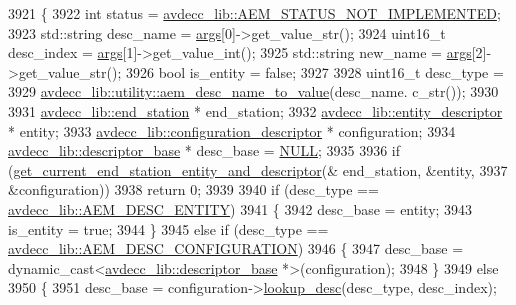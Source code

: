 \begin{DoxyCode}
3921 \{
3922     \textcolor{keywordtype}{int} status = \hyperlink{namespaceavdecc__lib_affd436edb2cecd20cfd784a84f852b2ba1de0a38d458af43bc8965b715fd37b4f}{avdecc\_lib::AEM\_STATUS\_NOT\_IMPLEMENTED};
3923     std::string desc\_name = \hyperlink{namespaceastime__fitline_a8187411843a6284ffb964ef3fb9fcab3}{args}[0]->get\_value\_str();
3924     uint16\_t desc\_index = \hyperlink{namespaceastime__fitline_a8187411843a6284ffb964ef3fb9fcab3}{args}[1]->get\_value\_int();
3925     std::string new\_name = \hyperlink{namespaceastime__fitline_a8187411843a6284ffb964ef3fb9fcab3}{args}[2]->get\_value\_str();
3926     \textcolor{keywordtype}{bool} is\_entity = \textcolor{keyword}{false};
3927 
3928     uint16\_t desc\_type =
3929         \hyperlink{namespaceavdecc__lib_1_1utility_a9f6076e32fa227555a95b6e95ea1e29b}{avdecc\_lib::utility::aem\_desc\_name\_to\_value}(desc\_name.
      c\_str());
3930 
3931     \hyperlink{classavdecc__lib_1_1end__station}{avdecc\_lib::end\_station} * end\_station;
3932     \hyperlink{classavdecc__lib_1_1entity__descriptor}{avdecc\_lib::entity\_descriptor} * entity;
3933     \hyperlink{classavdecc__lib_1_1configuration__descriptor}{avdecc\_lib::configuration\_descriptor} * configuration;
3934     \hyperlink{classavdecc__lib_1_1descriptor__base}{avdecc\_lib::descriptor\_base} * desc\_base = \hyperlink{openavb__types__base__pub_8h_a070d2ce7b6bb7e5c05602aa8c308d0c4}{NULL};
3935 
3936     \textcolor{keywordflow}{if} (\hyperlink{classcmd__line_ac2d4611fba7db03d436a2e3c1e64828e}{get\_current\_end\_station\_entity\_and\_descriptor}(&
      end\_station, &entity,
3937                                                       &configuration))
3938         \textcolor{keywordflow}{return} 0;
3939 
3940     \textcolor{keywordflow}{if} (desc\_type == \hyperlink{namespaceavdecc__lib_ac7b7d227e46bc72b63ee9e9aae15902fac9ebb31a55e5894637f6c3c710ceceaf}{avdecc\_lib::AEM\_DESC\_ENTITY})
3941     \{
3942         desc\_base = entity;
3943         is\_entity = \textcolor{keyword}{true};
3944     \}
3945     \textcolor{keywordflow}{else} \textcolor{keywordflow}{if} (desc\_type == \hyperlink{namespaceavdecc__lib_ac7b7d227e46bc72b63ee9e9aae15902fab391827cda146b0d4199adf80f47117a}{avdecc\_lib::AEM\_DESC\_CONFIGURATION})
3946     \{
3947         desc\_base = \textcolor{keyword}{dynamic\_cast<}\hyperlink{classavdecc__lib_1_1descriptor__base}{avdecc\_lib::descriptor\_base} *\textcolor{keyword}{>}(configuration);
3948     \}
3949     \textcolor{keywordflow}{else}
3950     \{
3951         desc\_base = configuration->\hyperlink{classavdecc__lib_1_1configuration__descriptor_a21110c55f9064bbae432ae984106bb26}{lookup\_desc}(desc\_type, desc\_index);

\end{DoxyCode}
